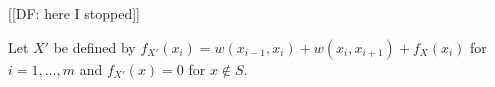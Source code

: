 \documentclass{article}
\newtheorem{definition}[thm]{Definition}
\newtheorem{proposition}[thm]{Proposition}
\DeclareMathOperator{\support}{support}
\begin{document}
%
%
%


%

[[DF: here I stopped]]


Let $X'$ be defined by $f_{X'}(x_{i}) = w(x_{i-1},x_i) + w(x_i,x_{i+1}) + f_{X}(x_i)$ for $i=1,\dots,m$ and $f_{X'}(x)=0$ for $x \notin S$.
\end{document}
